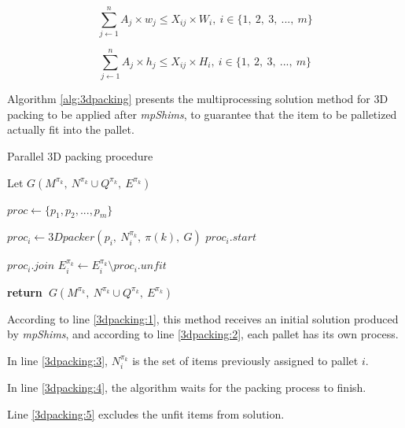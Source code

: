 \documentclass[preprint,authoryear]{elsarticle}
\renewcommand{\Return}{\State \bf {return}~}
\begin{document}
\begin{equation} \label{eq:3dpacking3}
	\sum_{j \gets 1}^{n} A_{j} \times w_j  \leq X_{ij} \times W_i,\ i \in \{1,\ 2,\ 3,\ ...,\ m\}
\end{equation}

\begin{equation} \label{eq:3dpacking4}
	\sum_{j \gets 1}^{n} A_{j} \times h_j  \leq X_{ij} \times H_i,\ i \in \{1,\ 2,\ 3,\ ...,\ m\}
\end{equation}

Algorithm \ref{alg:3dpacking} presents the multiprocessing solution method for 3D packing to be applied after {\it mpShims}, to guarantee that the item to be palletized actually fit into the pallet.

\begin{algorithm}[H]
	\caption{Parallel 3D packing procedure}  \label{alg:3dpacking}
	
	\begin{algorithmic}[1]
		
		
		\State Let $G(M^{\pi_k},\ N^{\pi_k} \cup Q^{\pi_k},\ E^{\pi_k})$ \label{3dpacking:1}
		
		\State $proc \gets \{p_1,p_2,..., p_m\}$ \label{3dpacking:2} 
		
		\State $proc_i \gets 3Dpacker(p_i,\ N^{\pi_k}_i,\ \pi(k),\ G )$   \label{3dpacking:3}
		\State $proc_i.start$
		\EndFor
		
		\State $proc_i.join$ \label{3dpacking:4}
		\State $E^{\pi_k}_i \gets E^{\pi_k}_i \setminus proc_i.unfit$  \label{3dpacking:5} 
		\EndFor
		
		\Return $G(M^{\pi_k},\ N^{\pi_k} \cup Q^{\pi_k},\ E^{\pi_k})$
		
		\EndProcedure
		
	\end{algorithmic}
\end{algorithm}

According to line \ref{3dpacking:1}, this method receives an initial solution produced by {\it mpShims}, and according to line \ref{3dpacking:2}, each pallet has its own process.

In line \ref{3dpacking:3}, $N^{\pi_k}_i$ is the set of items previously assigned to pallet $i$.

In line \ref{3dpacking:4}, the algorithm waits for the packing process to finish.

Line \ref{3dpacking:5} excludes the unfit items from solution.
\end{document}
